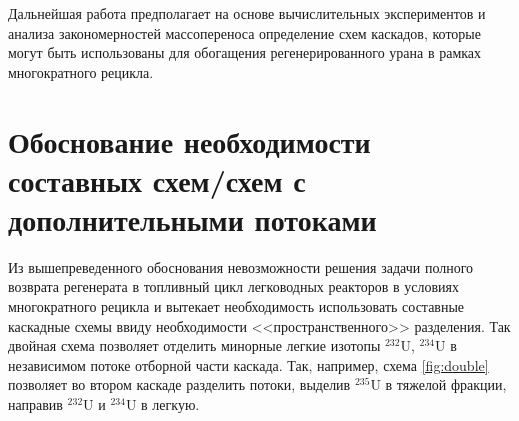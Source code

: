 
Дальнейшая работа предполагает на основе вычислительных экспериментов и анализа закономерностей массопереноса определение схем каскадов, которые могут быть использованы для обогащения регенерированного урана в рамках многократного рецикла.

\section{Обоснование необходимости составных схем/схем с дополнительными потоками}\label{sec:ch2/sec2}
Из вышепреведенного обоснования невозможности решения задачи полного возврата регенерата в топливный цикл легководных реакторов в условиях многократного рецикла и вытекает необходимость использовать составные каскадные схемы ввиду необходимости  <<пространственного>> разделения. Так двойная схема позволяет отделить минорные легкие изотопы $^{232}$U, $^{234}$U в независимом потоке отборной части каскада.
Так, например, схема \ref{fig:double} позволяет во втором каскаде разделить потоки, выделив $^{235}$U в тяжелой фракции, направив $^{232}$U и $^{234}$U в легкую.

